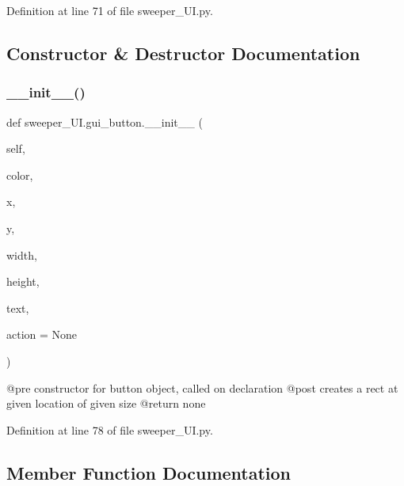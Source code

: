 Definition at line 71 of file sweeper\+\_\+\+U\+I.\+py.



\subsection{Constructor \& Destructor Documentation}
\mbox{\label{classsweeper___u_i_1_1gui__button_a0d9c0c788a776c9d8663a285852fe998}} 
\subsubsection{\texorpdfstring{\+\_\+\+\_\+init\+\_\+\+\_\+()}{\_\_init\_\_()}}
{\footnotesize\ttfamily def sweeper\+\_\+\+U\+I.\+gui\+\_\+button.\+\_\+\+\_\+init\+\_\+\+\_\+ (\begin{DoxyParamCaption}\item[{}]{self,  }\item[{}]{color,  }\item[{}]{x,  }\item[{}]{y,  }\item[{}]{width,  }\item[{}]{height,  }\item[{}]{text,  }\item[{}]{action = {\ttfamily None} }\end{DoxyParamCaption})}

\begin{DoxyVerb}@pre constructor for button object, called on declaration
@post creates a rect at given location of given size
@return none
\end{DoxyVerb}
 

Definition at line 78 of file sweeper\+\_\+\+U\+I.\+py.



\subsection{Member Function Documentation}
\mbox{\label{classsweeper___u_i_1_1gui__button_af74950231e0ddbcb8582404a8320dee5}} 
